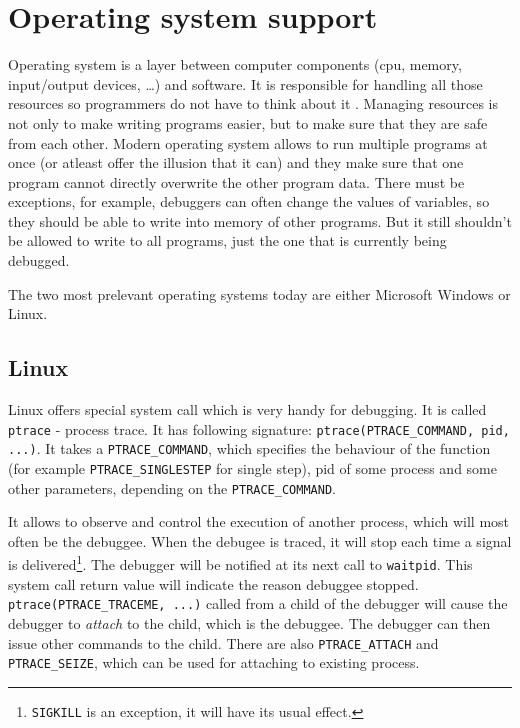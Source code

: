 \section{Operating system support}
Operating system is a layer between computer components (cpu, memory, input/output devices, \dots) and software. It is responsible for handling all those resources so programmers do not have to think about it \cite{modern-os}. Managing resources is not only to make writing programs easier, but to make sure that they are 
safe from each other. Modern operating system allows to run multiple programs at once (or atleast offer the illusion that it can) and they make sure that
one program cannot directly overwrite the other program data. There must be exceptions, for example, debuggers can often change the values of variables,
so they should be able to write into memory of other programs. But it still shouldn't be allowed to write to all programs, just the one that is currently being debugged.

The two most prelevant operating systems today are either Microsoft Windows or Linux.

\subsection{Linux}
Linux offers special system call which is very handy for debugging. It is called \texttt{ptrace} \cite{ptrace} - process
trace. It has following signature: \texttt{ptrace(PTRACE_COMMAND, pid, ...)}. It takes a \texttt{PTRACE_COMMAND},
which specifies the behaviour of the function (for example \texttt{PTRACE_SINGLESTEP} for single step), pid of some
process and some other parameters, depending on the \texttt{PTRACE_COMMAND}. 

It allows to observe and control the execution of another process, which will most often be the debuggee.
When the debugee is traced, it will stop each time a signal is delivered\footnote{\texttt{SIGKILL}
is an exception, it will have its usual effect.}. The debugger will be notified at its next call to \texttt{waitpid}.
This system call return value will indicate the reason debuggee stopped. \texttt{ptrace(PTRACE_TRACEME, ...)}
called from a child of the debugger will cause the debugger to \textit{attach} to the child, which is the debuggee.
The debugger can then issue other commands to the child. There are also \texttt{PTRACE_ATTACH} and
\texttt{PTRACE_SEIZE}, which can be used for attaching to existing process.

